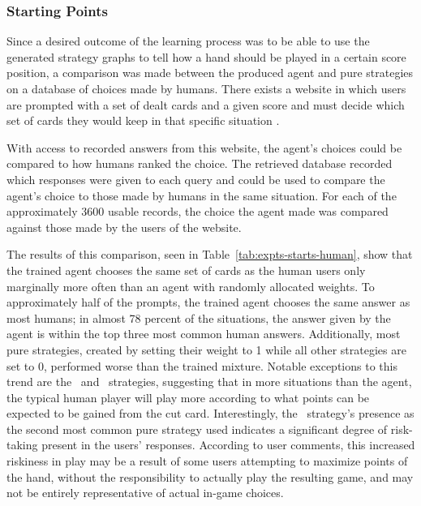 

\subsubsection*{Starting Points}
\label{sec:findings-expts-starts}

Since a desired outcome of the learning process was to be able to use the
generated strategy graphs to tell how a hand should be played in a
certain score position,
a comparison was made between the produced agent and pure strategies
on a database of choices made by humans.
%
There exists a website in which users are prompted with a set of dealt cards and
a given score and must decide which set of cards they would keep in that
specific situation
\cite{dailycribbagehand}.

With access to recorded answers from this website,
the agent's choices could be compared to how humans ranked the choice.
%
The retrieved database recorded which responses were given to each query
and could be used to compare the agent's choice
to those made by humans in the same situation.
%
For each of the approximately 3600 usable records,
the choice the agent made was compared against those made by the users of the
website.

The results of this comparison,
seen in Table~\ref{tab:expts-starts-human}, %
show that the trained agent chooses the same
set of cards as the human users only marginally more often than an agent with 
randomly allocated weights.
%
To approximately half of the prompts,
the trained agent chooses the same answer as most humans;
in almost 78 percent of the situations,
the answer given by the agent is within the top three most common human answers.
%
Additionally,
most pure strategies,
created by setting their weight to 1 while all other strategies are set to 0,
performed worse than the trained mixture.
%
Notable exceptions to this trend are the \handmaxposs\ and \handmaxavg\ 
strategies,
suggesting that in more situations than the agent,
the typical human player will play more according to what points can be expected
to be gained from the cut card.
%
Interestingly,
the \handmaxposs\ strategy's presence as the second most common pure strategy
used indicates a significant degree of risk-taking present in the users'
responses.
%
According to user comments,
this increased riskiness in play
may be a result of some users attempting to maximize points of the hand,
without the responsibility to actually play the resulting game,
and may not be entirely representative of actual in-game choices.

